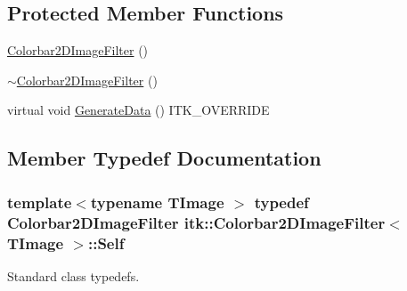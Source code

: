 \subsection*{Protected Member Functions}
\begin{DoxyCompactItemize}
\item 
\hyperlink{classitk_1_1_colorbar2_d_image_filter_ae103d71eaad083a9303743ee0789457f}{Colorbar2\-D\-Image\-Filter} ()
\item 
\hyperlink{classitk_1_1_colorbar2_d_image_filter_ae2fca5a6a90a6d3dc4ab6f1ae569be9c}{$\sim$\-Colorbar2\-D\-Image\-Filter} ()
\item 
virtual void \hyperlink{classitk_1_1_colorbar2_d_image_filter_aeddf7656f339c33f2412bc222db4d558}{Generate\-Data} () I\-T\-K\-\_\-\-O\-V\-E\-R\-R\-I\-D\-E
\end{DoxyCompactItemize}


\subsection{Member Typedef Documentation}
\hypertarget{classitk_1_1_colorbar2_d_image_filter_a2c93d9d0cfe2be77c3f86bf7c9526c34}{
\subsubsection[{Self}]{\setlength{\rightskip}{0pt plus 5cm}template$<$typename T\-Image $>$ typedef {\bf Colorbar2\-D\-Image\-Filter} {\bf itk\-::\-Colorbar2\-D\-Image\-Filter}$<$ T\-Image $>$\-::{\bf Self}}}\label{classitk_1_1_colorbar2_d_image_filter_a2c93d9d0cfe2be77c3f86bf7c9526c34}
Standard class typedefs. 

